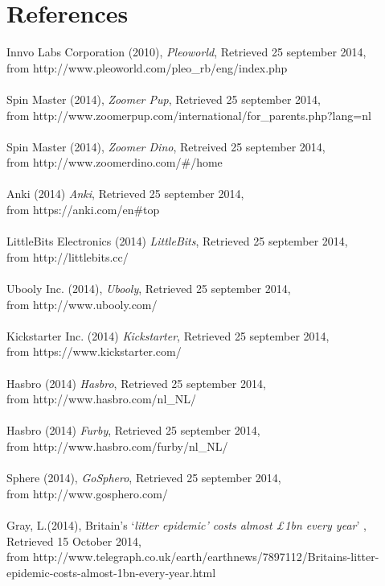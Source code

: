 \documentclass[11pt,twoside,a4paper]{report}
\begin{document}
\chapter{References}
Innvo Labs Corporation (2010), \textit{Pleoworld}, Retrieved 25 september 2014, \\from http://www.pleoworld.com/pleo\_rb/eng/index.php \\
\\
Spin Master (2014), \textit{Zoomer Pup}, Retrieved 25 september 2014, \\from http://www.zoomerpup.com/international/for\_parents.php?lang=nl\\
\\
Spin Master (2014), \textit{Zoomer Dino}, Retreived 25 september 2014, \\from http://www.zoomerdino.com/\#/home\\
\\
Anki (2014) \textit{Anki}, Retrieved 25 september 2014, \\from https://anki.com/en\#top \\
\\
LittleBits Electronics (2014) \textit{LittleBits}, Retrieved 25 september 2014,\\ from http://littlebits.cc/ \\
\\
Ubooly Inc. (2014), \textit{Ubooly}, Retrieved 25 september 2014,\\ from http://www.ubooly.com/ \\
\\
Kickstarter Inc. (2014) \textit{Kickstarter}, Retrieved 25 september 2014, \\from https://www.kickstarter.com/ \\
\\
Hasbro (2014) \textit{Hasbro}, Retrieved 25 september 2014, \\from http://www.hasbro.com/nl\_NL/ \\
\\
Hasbro (2014) \textit{Furby}, Retrieved 25 september 2014, \\from http://www.hasbro.com/furby/nl\_NL/ \\
\\
Sphere (2014), \textit{GoSphero}, Retrieved 25 september 2014,\\ from http://www.gosphero.com/ \\
\\
Gray, L.(2014), Britain’s ‘\textit{litter epidemic’ costs almost £1bn every year}’ , Retrieved 15 October 2014, \\from http://www.telegraph.co.uk/earth/earthnews/7897112/Britains-litter-epidemic-costs-almost-1bn-every-year.html \\
\end{document}
